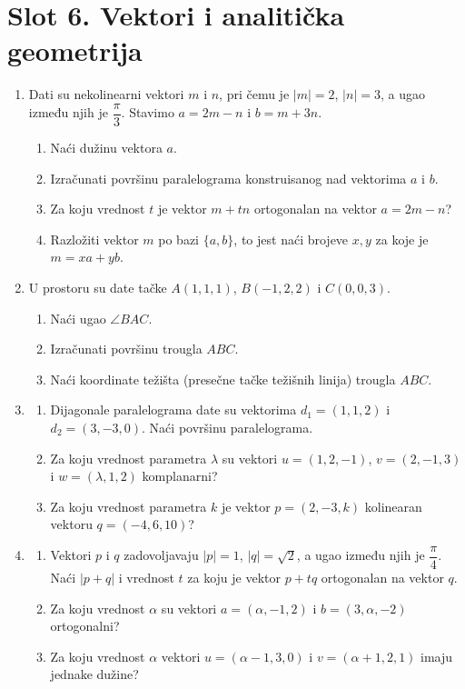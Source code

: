 \section*{Slot 6. Vektori i analitička geometrija}
\begin{enumerate}[label=\arabic*.]

\item Dati su nekolinearni vektori $m$ i $n$, pri čemu je $|m|=2$, $|n|=3$, a ugao između njih je $\dfrac{\pi}{3}$. Stavimo $a=2m-n$ i $b=m+3n$.
\begin{enumerate}[label=\alph*)]
\item Naći dužinu vektora $a$.
\item Izračunati površinu paralelograma konstruisanog nad vektorima $a$ i $b$.
\item Za koju vrednost $t$ je vektor $m+tn$ ortogonalan na vektor $a=2m-n$?
\item Razložiti vektor $m$ po bazi $\{a,b\}$, to jest naći brojeve $x,y$ za koje je $m=xa+yb$.
\end{enumerate}

\item U prostoru su date tačke $A(1,1,1)$, $B(-1,2,2)$ i $C(0,0,3)$.
\begin{enumerate}[label=\alph*)]
\item Naći ugao $\angle BAC$.
\item Izračunati površinu trougla $ABC$.
\item Naći koordinate težišta (presečne tačke težišnih linija) trougla $ABC$.
\end{enumerate}

\item \begin{enumerate}[label=\alph*)]
\item Dijagonale paralelograma date su vektorima $d_1=(1,1,2)$ i $d_2=(3,-3,0)$. Naći površinu paralelograma.
\item Za koju vrednost parametra $\lambda$ su vektori $u=(1,2,-1)$, $v=(2,-1,3)$ i $w=(\lambda,1,2)$ komplanarni?
\item Za koju vrednost parametra $k$ je vektor $p=(2,-3,k)$ kolinearan vektoru $q=(-4,6,10)$?
\end{enumerate}

\item \begin{enumerate}[label=\alph*)]
\item Vektori $p$ i $q$ zadovoljavaju $|p|=1$, $|q|=\sqrt2$, a ugao između njih je $\dfrac{\pi}{4}$. Naći $|p+q|$ i vrednost $t$ za koju je vektor $p+tq$ ortogonalan na vektor $q$.
\item Za koju vrednost $\alpha$ su vektori $a=(\alpha,-1,2)$ i $b=(3,\alpha,-2)$ ortogonalni?
\item Za koju vrednost $\alpha$ vektori $u=(\alpha-1,3,0)$ i $v=(\alpha+1,2,1)$ imaju jednake dužine?
\end{enumerate}


\end{enumerate}
